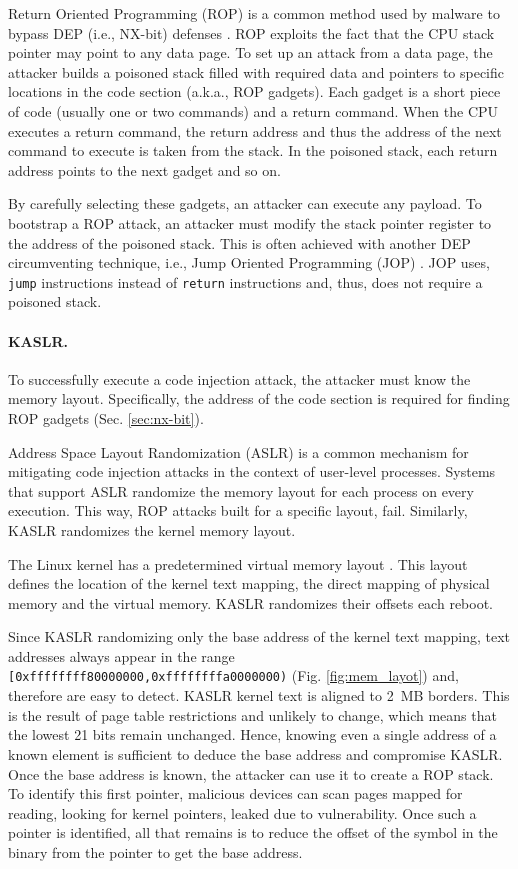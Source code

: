 Return Oriented Programming (ROP) is a common method used by malware to bypass DEP (i.e., NX-bit) defenses \cite{RBSS12}. ROP exploits the fact that the CPU stack pointer may point to any data page. To set up an attack from a data page, the attacker builds a poisoned stack filled with required data and pointers to specific locations in the code section (a.k.a., ROP gadgets). Each gadget is a short piece of code (usually one or two commands) and a return command. When the CPU executes a return command, the return address and thus the address of the next command to execute is taken from the stack. In the poisoned stack, each return address points to the next gadget and so on. 
 
By carefully selecting these gadgets, an attacker can execute any payload. To bootstrap a ROP attack, an attacker must modify the stack pointer register to the address of the poisoned stack. This is often achieved with another DEP circumventing technique, i.e., Jump Oriented Programming (JOP) \cite{BJFL11}. JOP uses, \texttt{jump} instructions instead of \texttt{return} instructions and, thus, does not require a poisoned stack.

\paragraph{KASLR.}\label{sec:kaslr}

To successfully execute a code injection attack, the attacker must know the memory layout. Specifically, the address of the code section is required for finding ROP gadgets (Sec. \ref{sec:nx-bit}). 

Address Space Layout Randomization (ASLR) is a common mechanism for mitigating code injection attacks in the context of user-level processes. Systems that support ASLR randomize the memory layout for each process on every execution. This way, ROP attacks built for a specific layout, fail. Similarly, KASLR \cite{kalsr} randomizes the kernel memory layout.

The Linux kernel has a predetermined virtual memory layout \cite{mem_layout}. This layout defines the location of the kernel text mapping, the direct mapping of physical memory and the virtual memory. KASLR randomizes their offsets each reboot.

Since KASLR randomizing only the base address of the kernel text mapping, text addresses always appear in the range \texttt{[0xffffffff80000000,0xffffffffa0000000)} (Fig. \ref{fig:mem_layot}) and, therefore are easy to detect. KASLR kernel text is aligned to 2~MB borders. This is the result of page table restrictions and unlikely to change, which means that the lowest 21 bits remain unchanged. Hence, knowing even a single address of a known element is sufficient to deduce the base address and compromise KASLR. Once the base address is known, the attacker can use it to create a ROP stack. To identify this first pointer, malicious devices can scan pages mapped for reading, looking for kernel pointers, leaked due to \subpage{} vulnerability. Once such a pointer is identified, all that remains is to reduce the offset of the symbol in the binary from the pointer to get the base address.

